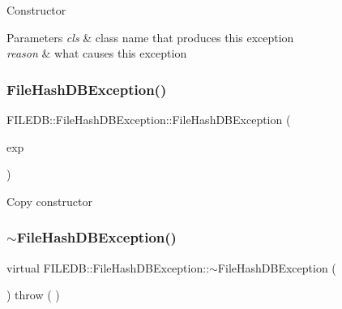 Constructor 
\begin{DoxyParams}{Parameters}
{\em cls} & class name that produces this exception \\
\hline
{\em reason} & what causes this exception \\
\hline
\end{DoxyParams}
\mbox{\label{classFILEDB_1_1FileHashDBException_ad018a7bda0cfd93d2efac5c16c10886e}} 
\subsubsection{\texorpdfstring{FileHashDBException()}{FileHashDBException()}\hspace{0.1cm}{\footnotesize\ttfamily [8/9]}}
{\footnotesize\ttfamily F\+I\+L\+E\+D\+B\+::\+File\+Hash\+D\+B\+Exception\+::\+File\+Hash\+D\+B\+Exception (\begin{DoxyParamCaption}\item[{const \mbox{\hyperlink{classFILEDB_1_1FileHashDBException}{File\+Hash\+D\+B\+Exception}} \&}]{exp }\end{DoxyParamCaption})}

Copy constructor \mbox{\label{classFILEDB_1_1FileHashDBException_aacf132dca5ed0d1b8dc3e4694c77c190}} 
\subsubsection{\texorpdfstring{$\sim$FileHashDBException()}{~FileHashDBException()}\hspace{0.1cm}{\footnotesize\ttfamily [3/3]}}
{\footnotesize\ttfamily virtual F\+I\+L\+E\+D\+B\+::\+File\+Hash\+D\+B\+Exception\+::$\sim$\+File\+Hash\+D\+B\+Exception (\begin{DoxyParamCaption}\item[{void}]{ }\end{DoxyParamCaption}) throw ( ) \hspace{0.3cm}{\ttfamily [virtual]}}

